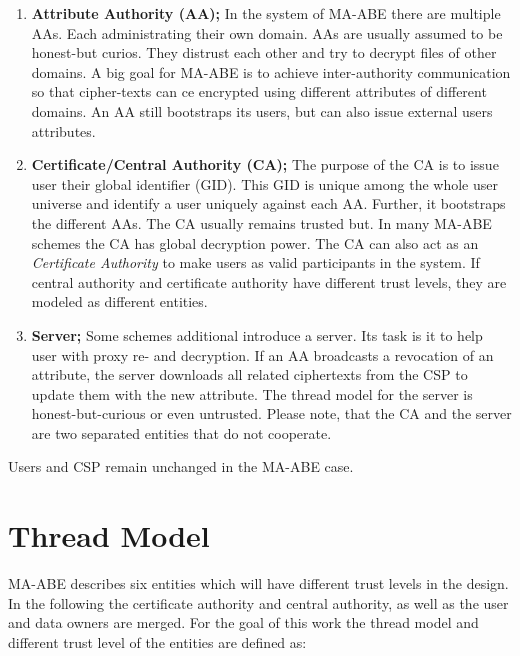 \begin{enumerate}
	\item \textbf{Attribute Authority (\ac{AA});} In the system of MA-ABE there are multiple AAs. Each administrating their own domain. AAs are usually assumed to be honest-but curios. They distrust each other and try to decrypt files of other domains. A big goal for MA-ABE is to achieve inter-authority communication so that cipher-texts can ce encrypted using different attributes of different domains. An AA still bootstraps its users, but can also issue external users attributes.
	\item \textbf{Certificate/Central Authority (\ac{CA});} The purpose of the \ac{CA} is to issue user their global identifier (\ac{GID}). This GID is unique among the whole user universe and identify a user uniquely against each AA. Further, it bootstraps the different \ac{AA}s. The \ac{CA} usually remains trusted but. In many MA-ABE schemes the CA has global decryption power. The CA can also act as an \textit{Certificate Authority} to make users as valid participants in the system. If central authority and certificate authority have different trust levels, they are modeled as different entities.
	\item \textbf{Server;} Some schemes additional introduce a server. Its task is it to help user with proxy re- and decryption. If an \ac{AA} broadcasts a revocation of an attribute, the server downloads all related ciphertexts from the \ac{CSP} to update them with the new attribute. 
	The thread model for the server is honest-but-curious or even untrusted. Please note, that the \ac{CA} and the server are two separated entities that do not cooperate.
\end{enumerate} 

Users and CSP remain unchanged in the MA-ABE case.

\section{Thread Model}
\label{sec:thread-model}
MA-ABE describes six entities which will have different trust levels in the design. In the following the certificate authority and central authority, as well as the user and data owners are merged. For the goal of this work the thread model and different trust level of the entities are defined as:

